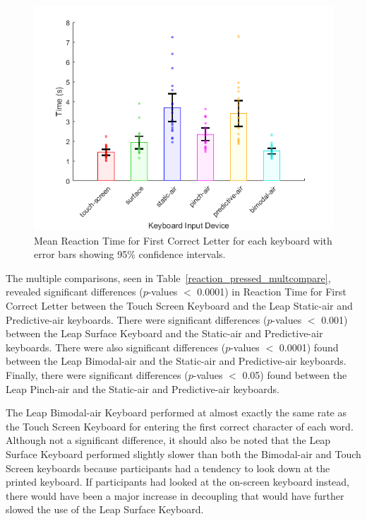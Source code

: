 \begin{figure}[!t]
	\centering
	\includegraphics{Figures/fig_reaction_pressed_mean}
	\caption[Mean Reaction Time for First Correct Letter]{Mean Reaction Time for First Correct Letter for each keyboard with error bars showing 95\% confidence intervals.}
	\label{fig_reaction_pressed_mean}
\end{figure}

The multiple comparisons, seen in Table~\ref{reaction_pressed_multcompare}, revealed significant differences ($p$-values $<$ 0.0001) in Reaction Time for First Correct Letter between the Touch Screen Keyboard and the Leap Static-air and Predictive-air keyboards. There were significant differences ($p$-values $<$ 0.001) between the Leap Surface Keyboard and the Static-air and Predictive-air keyboards. There were also significant differences ($p$-values $<$ 0.0001) found between the Leap Bimodal-air and the Static-air and Predictive-air keyboards. Finally, there were significant differences ($p$-values $<$ 0.05) found between the Leap Pinch-air and the Static-air and Predictive-air keyboards.

The Leap Bimodal-air Keyboard performed at almost exactly the same rate as the Touch Screen Keyboard for entering the first correct character of each word. Although not a significant difference, it should also be noted that the Leap Surface Keyboard performed slightly slower than both the Bimodal-air and Touch Screen keyboards because participants had a tendency to look down at the printed keyboard. If participants had looked at the on-screen keyboard instead, there would have been a major increase in decoupling that would have further slowed the use of the Leap Surface Keyboard.

